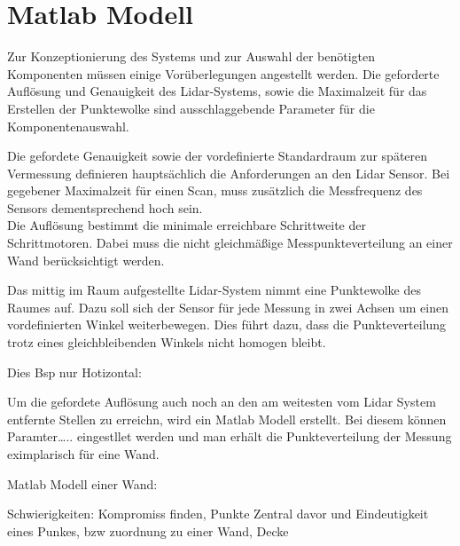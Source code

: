 

\chapter{Matlab Modell}\label{chap:matlab_modell}

Zur Konzeptionierung des Systems und zur Auswahl der benötigten Komponenten müssen einige Vorüberlegungen angestellt werden. Die geforderte Auflösung und Genauigkeit des Lidar-Systems, sowie die Maximalzeit für das Erstellen der Punktewolke sind ausschlaggebende Parameter für die Komponentenauswahl.

Die gefordete Genauigkeit sowie der vordefinierte Standardraum zur späteren Vermessung definieren hauptsächlich die Anforderungen an den Lidar Sensor. Bei gegebener Maximalzeit für einen Scan, muss zusätzlich die Messfrequenz des Sensors dementsprechend hoch sein. \\
Die Auflösung bestimmt die minimale erreichbare Schrittweite der Schrittmotoren. Dabei muss die nicht gleichmäßige Messpunkteverteilung an einer Wand berücksichtigt werden.

Das mittig im Raum aufgestellte Lidar-System nimmt eine Punktewolke des Raumes auf. Dazu soll sich der Sensor für jede Messung in zwei Achsen um einen vordefinierten Winkel weiterbewegen. Dies führt dazu, dass die Punkteverteilung trotz eines gleichbleibenden Winkels nicht homogen bleibt. 

Dies
Bsp nur Hotizontal:


Um die gefordete Auflösung auch noch an den am weitesten vom Lidar System entfernte Stellen zu erreichn, wird ein Matlab Modell erstellt. Bei diesem können Paramter….. eingestllet werden und man erhält die Punkteverteilung der Messung eximplarisch für eine Wand.

Matlab Modell einer Wand:

Schwierigkeiten:
Kompromiss finden, Punkte Zentral davor und 
Eindeutigkeit eines Punkes, bzw zuordnung zu einer Wand, Decke